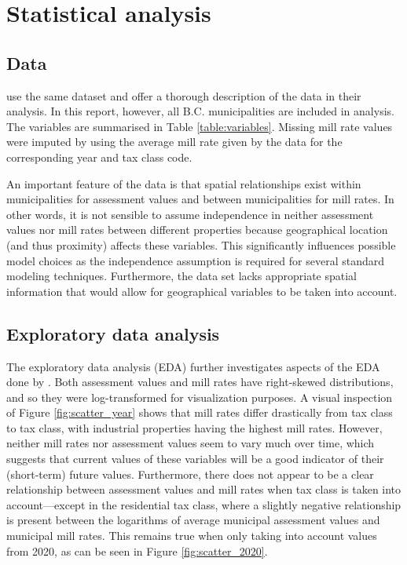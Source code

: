 \documentclass{article}
\begin{document}
\section{Statistical analysis} \label{section:analysis}

\subsection{Data} \label{sec:data}

\citet{s450-report} use the same dataset and offer a thorough description of the data in their analysis. In this report, however, all B.C. municipalities are included in analysis. The variables are summarised in Table \ref{table:variables}.  Missing mill rate values were imputed by using the average mill rate given by the data for the corresponding year and tax class code.  

An important feature of the data is that spatial relationships exist within municipalities for assessment values and between municipalities for mill rates.  In other words, it is not sensible to assume independence in neither assessment values nor mill rates between different properties because geographical location (and thus proximity) affects these variables. This significantly influences possible model choices as the independence assumption is required for several standard modeling techniques. Furthermore, the data set lacks appropriate spatial information that would allow for geographical variables to be taken into account.






\subsection{Exploratory data analysis} \label{section:eda}

The exploratory data analysis (EDA) further investigates aspects of the EDA done by \citet{s450-report}. Both assessment values and mill rates have right-skewed distributions, and so they were log-transformed for visualization purposes. A visual inspection of Figure \ref{fig:scatter_year} shows that mill rates differ drastically from tax class to tax class, with industrial properties having the highest mill rates. However, neither mill rates nor assessment values seem to vary much over time, which suggests that current values of these variables will be a good indicator of their (short-term) future values. Furthermore, there does not appear to be a clear relationship between assessment values and mill rates when tax class is taken into account---except in the residential tax class, where a slightly negative relationship is present between the logarithms of average municipal assessment values and municipal mill rates. This remains true when only taking into account values from 2020, as can be seen in Figure \ref{fig:scatter_2020}. 
\end{document}
